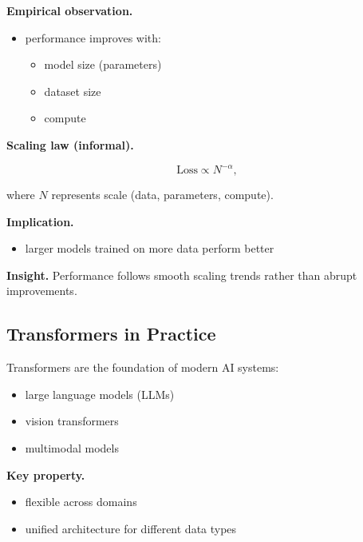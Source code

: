 \noindent
\textbf{Empirical observation.}

\begin{itemize}
    \item performance improves with:
    \begin{itemize}
        \item model size (parameters)
        \item dataset size
        \item compute
    \end{itemize}
\end{itemize}

\medskip

\noindent
\textbf{Scaling law (informal).}

\[
\text{Loss} \propto N^{-\alpha},
\]

where $N$ represents scale (data, parameters, compute).

\medskip

\noindent
\textbf{Implication.}

\begin{itemize}
    \item larger models trained on more data perform better
\end{itemize}

\medskip

\noindent
\textbf{Insight.}  
Performance follows smooth scaling trends rather than abrupt improvements.

\subsection{Transformers in Practice}

Transformers are the foundation of modern AI systems:

\begin{itemize}
    \item large language models (LLMs)
    \item vision transformers
    \item multimodal models
\end{itemize}

\medskip

\noindent
\textbf{Key property.}

\begin{itemize}
    \item flexible across domains
    \item unified architecture for different data types
\end{itemize}

